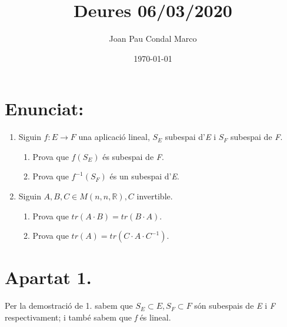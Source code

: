 \documentclass[a4paper, 11pt]{article}
\title{Deures 06/03/2020}
\author{Joan Pau Condal Marco}
\date{\today}
\begin{document}
    \maketitle

    \section*{Enunciat:}
    \begin{enumerate}
        \item Siguin ${f:E\longrightarrow F}$ una aplicaci\'o lineal, ${S_E}$ subespai d'\emph{E} i ${S_F}$ subespai de \emph{F}.
        \begin{enumerate}
            \item Prova que ${f(S_E)}$ \'es subespai de \emph{F}.
            \item Prova que ${f^{-1}(S_F)}$ \'es un subespai d'\emph{E}.
        \end{enumerate}
        \item Siguin ${A, B, C \in M(n,n,\mathbb{R}), C}$ invertible.
        \begin{enumerate}
            \item Prova que ${tr(A\cdot B) = tr(B\cdot A)}$.
            \item Prova que ${tr(A) = tr(C\cdot A \cdot C^{-1})}$.
        \end{enumerate}
    \end{enumerate}

    \section*{Apartat 1.}
        Per la demostraci\'o de 1. sabem que ${S_E \subset E, S_F \subset F}$ s\'on subespais de \emph{E} i \emph{F} respectivament; i tamb\'e sabem que \emph{f} \'es lineal.
\end{document}
